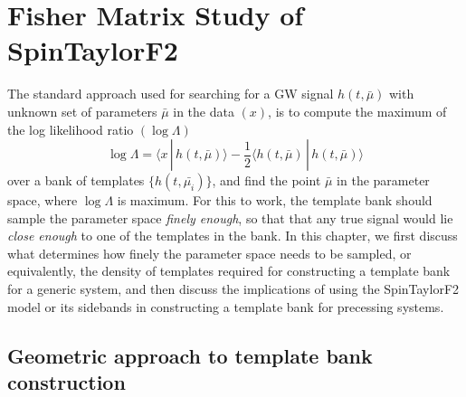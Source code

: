 
\chapter{Fisher Matrix Study of SpinTaylorF2}

The standard approach used for searching for a GW signal $h(t,\bar{\mu})$ with
unknown set of parameters $\bar{\mu}$ in the data $(x)$, is to compute the
maximum of the log likelihood ratio $(\log\Lambda)$
\begin{equation}
\log{\Lambda} = \langle x\, |\, h(t,\bar{\mu})\rangle - \dfrac{1}{2}\langle h(t,\bar{\mu})\, |\, h(t,\bar{\mu})\rangle
\end{equation}
over a bank of templates $\{h(t,\bar{\mu_i})\}$, and find the point
$\bar{\mu}$ in the parameter space, where $\log{\Lambda}$ is maximum. For this
to work, the template bank should sample the parameter space \textit{finely
enough}, so that that any true signal would lie \textit{close enough} to one of the
templates in the bank. In this chapter, we first discuss what determines how
finely the parameter space needs to be sampled, or equivalently, the density
of templates required for constructing a template bank for a generic system,
and then discuss the implications of using the SpinTaylorF2 model or its
sidebands in constructing a template bank for precessing systems.

\section{Geometric approach to template bank construction}

